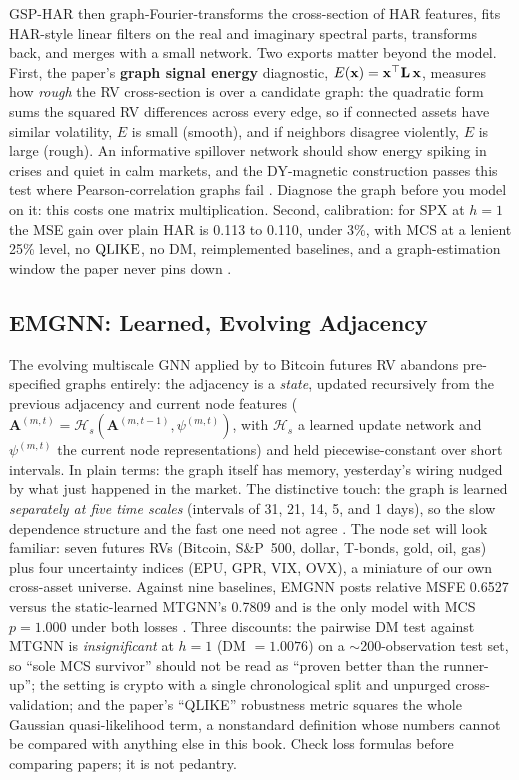 GSP-HAR then graph-Fourier-transforms the cross-section of HAR features, fits HAR-style linear filters on the real and imaginary spectral parts, transforms back, and merges with a small network. Two exports matter beyond the model. First, the paper's \textbf{graph signal energy} diagnostic, $E(\mathbf{x}) = \mathbf{x}^\top \mathbf{L}\, \mathbf{x}$, measures how \emph{rough} the RV cross-section is over a candidate graph: the quadratic form sums the squared RV differences across every edge, so if connected assets have similar volatility, $E$ is small (smooth), and if neighbors disagree violently, $E$ is large (rough). An informative spillover network should show energy spiking in crises and quiet in calm markets, and the DY-magnetic construction passes this test where Pearson-correlation graphs fail \citep[Figs.~1--2, \S3.1]{ChiGaoWang2024GSP}. Diagnose the graph before you model on it: this costs one matrix multiplication. Second, calibration: for SPX at $h=1$ the MSE gain over plain HAR is 0.113 to 0.110, under 3\%, with MCS at a lenient 25\% level, no $\operatorname{QLIKE}$, no DM, reimplemented baselines, and a graph-estimation window the paper never pins down \citep[Tables~1--3, p.~18--19]{ChiGaoWang2024GSP}.

\subsection{EMGNN: Learned, Evolving Adjacency}\label{sec:gnn:emgnn}

The evolving multiscale GNN applied by \citet{ZhouXieWangGongZhu2025} to Bitcoin futures RV abandons pre-specified graphs entirely: the adjacency is a \emph{state}, updated recursively from the previous adjacency and current node features ($\mathbf{A}^{(m,t)} = \mathcal{H}_s(\mathbf{A}^{(m,t-1)}, \psi^{(m,t)})$, with $\mathcal{H}_s$ a learned update network and $\psi^{(m,t)}$ the current node representations) and held piecewise-constant over short intervals. In plain terms: the graph itself has memory, yesterday's wiring nudged by what just happened in the market. The distinctive touch: the graph is learned \emph{separately at five time scales} (intervals of 31, 21, 14, 5, and 1 days), so the slow dependence structure and the fast one need not agree \citep[eqs.~10--14, pp.~17--18, 20]{ZhouXieWangGongZhu2025}. The node set will look familiar: seven futures RVs (Bitcoin, S\&P~500, dollar, T-bonds, gold, oil, gas) plus four uncertainty indices (EPU, GPR, VIX, OVX), a miniature of our own cross-asset universe. Against nine baselines, EMGNN posts relative MSFE 0.6527 versus the static-learned MTGNN's 0.7809 and is the only model with MCS $p = 1.000$ under both losses \citep[Table~5, p.~23]{ZhouXieWangGongZhu2025}. Three discounts: the pairwise DM test against MTGNN is \emph{insignificant} at $h=1$ (DM $= 1.0076$) on a $\sim$200-observation test set, so ``sole MCS survivor'' should not be read as ``proven better than the runner-up''; the setting is crypto with a single chronological split and unpurged cross-validation; and the paper's ``QLIKE'' robustness metric squares the whole Gaussian quasi-likelihood term, a nonstandard definition whose numbers cannot be compared with anything else in this book. Check loss formulas before comparing papers; it is not pedantry.

